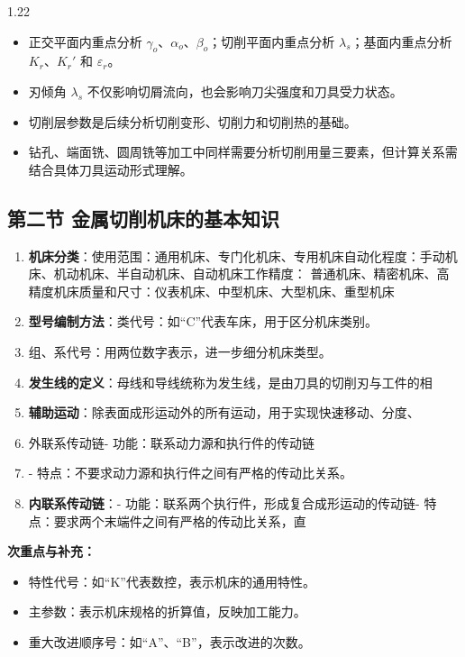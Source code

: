 \documentclass[12pt,a4paper]{article}
\begin{document}
\begin{spacing}{1.22}
\begin{itemize}[leftmargin=2.2em,label=--]
  \item 正交平面内重点分析 $\gamma_o$、$\alpha_o$、$\beta_o$；切削平面内重点分析 $\lambda_s$；基面内重点分析 $K_r$、$K_r'$ 和 $\varepsilon_r$。
  \item 刃倾角 $\lambda_s$ 不仅影响切屑流向，也会影响刀尖强度和刀具受力状态。
  \item 切削层参数是后续分析切削变形、切削力和切削热的基础。
  \item 钻孔、端面铣、圆周铣等加工中同样需要分析切削用量三要素，但计算关系需结合具体刀具运动形式理解。
\end{itemize}

\subsection{第二节 金属切削机床的基本知识}
\begin{tcolorbox}[colback=yellow!6,colframe=red!55!black,title=重点,left=1mm,right=1mm]
\begin{enumerate}[leftmargin=2.2em,label=\arabic*.]
  \item \textbf{机床分类}：使用范围：通用机床、专门化机床、专用机床自动化程度：手动机床、机动机床、半自动机床、自动机床工作精度： 普通机床、精密机床、高精度机床质量和尺寸：仪表机床、中型机床、大型机床、重型机床
  \item \textbf{型号编制方法}：类代号：如“C”代表车床，用于区分机床类别。
  \item 组、系代号：用两位数字表示，进一步细分机床类型。
  \item \textbf{发生线的定义}：母线和导线统称为发生线，是由刀具的切削刃与工件的相
  \item \textbf{辅助运动}：除表面成形运动外的所有运动，用于实现快速移动、分度、
  \item 外联系传动链- 功能：联系动力源和执行件的传动链
  \item - 特点：不要求动力源和执行件之间有严格的传动比关系。
  \item \textbf{内联系传动链}：- 功能：联系两个执行件，形成复合成形运动的传动链- 特点：要求两个末端件之间有严格的传动比关系，直
\end{enumerate}
\end{tcolorbox}
\noindent\textbf{次重点与补充：}
\begin{itemize}[leftmargin=2.2em,label=--]
  \item 特性代号：如“K”代表数控，表示机床的通用特性。
  \item 主参数：表示机床规格的折算值，反映加工能力。
  \item 重大改进顺序号：如“A”、“B”，表示改进的次数。

\end{itemize}
\end{spacing}
\end{document}
